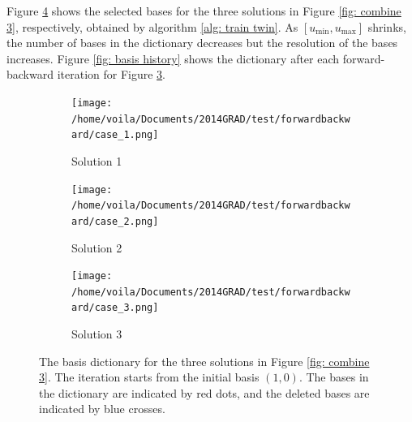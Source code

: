 Figure \ref{fig: basis pnt} shows the selected bases
for the three solutions in Figure \ref{fig: combine 3}, respectively, obtained by 
algorithm \ref{alg: train twin}.
As $\left[u_{\min}, u_{\max}\right]$ shrinks, the number of bases in the dictionary decreases
but the resolution of the bases increases. Figure \ref{fig: basis history} shows
the dictionary after each forward-backward iteration for Figure \ref{fig: basis pnt 3}.\\

\begin{figure}[htbp]\begin{center}
    \begin{subfigure}[t]{.32\textwidth}
        \centering
        \texttt{[image: /home/voila/Documents/2014GRAD/test/forwardbackward/case\_1.png]}
        \caption{Solution 1}
        \label{fig: basis pnt 1}
    \end{subfigure}
    \begin{subfigure}[t]{.32\textwidth}     
        \centering
        \texttt{[image: /home/voila/Documents/2014GRAD/test/forwardbackward/case\_2.png]}
        \caption{Solution 2}
        \label{fig: basis pnt 2}
    \end{subfigure}
    \begin{subfigure}[t]{.32\textwidth}
        \centering
        \texttt{[image: /home/voila/Documents/2014GRAD/test/forwardbackward/case\_3.png]}
        \caption{Solution 3}
        \label{fig: basis pnt 3}
    \end{subfigure}
    \caption{The basis dictionary for the three solutions in Figure \ref{fig: combine 3}.
             The iteration starts from the initial basis $(1,0)$. The bases in the
             dictionary are indicated by red dots, and the deleted bases are indicated
             by blue crosses.}
    \label{fig: basis pnt}
\end{center}\end{figure}


